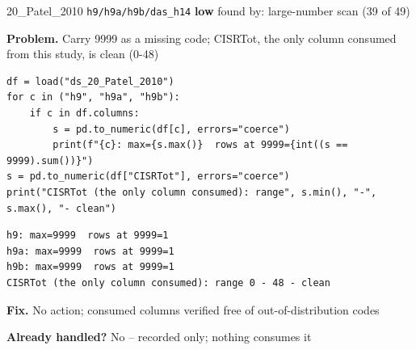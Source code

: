 \documentclass[9pt, t, handout]{beamer}
\newcommand{\ans}[1]{\textcolor{structure.fg}{#1}}
\begin{document}
\begin{frame}[fragile]{20\_Patel\_2010 \quad \texttt{h9/h9a/h9b/das\_h14}}
  {\scriptsize\textcolor{black!55}{\textbf{low}} \quad
   found by: large-number scan \quad (39 of 49)}
  \vspace{3pt}

  {\footnotesize \textbf{Problem.} Carry 9999 as a missing code; CISRTot, the only column consumed from this study, is clean (0-48)}
  \vspace{4pt}

  \begin{Verbatim}[fontsize=\tiny, frame=single, framesep=2pt, label=\tiny reproduce]
df = load("ds_20_Patel_2010")
for c in ("h9", "h9a", "h9b"):
    if c in df.columns:
        s = pd.to_numeric(df[c], errors="coerce")
        print(f"{c}: max={s.max()}  rows at 9999={int((s == 9999).sum())}")
s = pd.to_numeric(df["CISRTot"], errors="coerce")
print("CISRTot (the only column consumed): range", s.min(), "-", s.max(), "- clean")
  \end{Verbatim}
  \begin{Verbatim}[fontsize=\tiny, frame=single, framesep=2pt, label=\tiny output]
h9: max=9999  rows at 9999=1
h9a: max=9999  rows at 9999=1
h9b: max=9999  rows at 9999=1
CISRTot (the only column consumed): range 0 - 48 - clean
  \end{Verbatim}
  \vspace{2pt}

  {\footnotesize \textbf{Fix.} No action; consumed columns verified free of out-of-distribution codes}
  \vspace{2pt}

  {\footnotesize \textbf{Already handled?} \ans{No} -- recorded only; nothing consumes it
   }
\end{frame}
\end{document}
